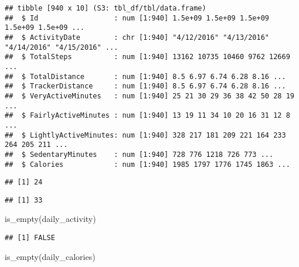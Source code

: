 \documentclass[
]{article}
\newenvironment{Shaded}{\begin{snugshade}}{\end{snugshade}}
\newcommand{\FunctionTok}[1]{\textcolor[rgb]{0.00,0.00,0.00}{#1}}
\newcommand{\NormalTok}[1]{#1}
\newcommand{\SpecialCharTok}[1]{\textcolor[rgb]{0.00,0.00,0.00}{#1}}
\begin{document}
\begin{verbatim}
## tibble [940 x 10] (S3: tbl_df/tbl/data.frame)
##  $ Id                  : num [1:940] 1.5e+09 1.5e+09 1.5e+09 1.5e+09 1.5e+09 ...
##  $ ActivityDate        : chr [1:940] "4/12/2016" "4/13/2016" "4/14/2016" "4/15/2016" ...
##  $ TotalSteps          : num [1:940] 13162 10735 10460 9762 12669 ...
##  $ TotalDistance       : num [1:940] 8.5 6.97 6.74 6.28 8.16 ...
##  $ TrackerDistance     : num [1:940] 8.5 6.97 6.74 6.28 8.16 ...
##  $ VeryActiveMinutes   : num [1:940] 25 21 30 29 36 38 42 50 28 19 ...
##  $ FairlyActiveMinutes : num [1:940] 13 19 11 34 10 20 16 31 12 8 ...
##  $ LightlyActiveMinutes: num [1:940] 328 217 181 209 221 164 233 264 205 211 ...
##  $ SedentaryMinutes    : num [1:940] 728 776 1218 726 773 ...
##  $ Calories            : num [1:940] 1985 1797 1776 1745 1863 ...
\end{verbatim}

\begin{Shaded}
\end{Shaded}

\begin{verbatim}
## [1] 24
\end{verbatim}

\begin{Shaded}
\end{Shaded}

\begin{verbatim}
## [1] 33
\end{verbatim}

\begin{Shaded}
\begin{Highlighting}[]
\FunctionTok{is\_empty}\NormalTok{(daily\_activity)}
\end{Highlighting}
\end{Shaded}

\begin{verbatim}
## [1] FALSE
\end{verbatim}

\begin{Shaded}
\begin{Highlighting}[]
\FunctionTok{is\_empty}\NormalTok{(daily\_calories)}
\end{Highlighting}
\end{Shaded}
\end{document}
